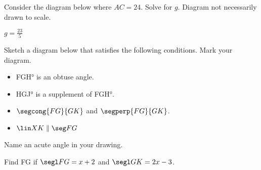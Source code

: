 \begin{exercises}

\begin{ex} \e Consider the diagram below where $AC = 24$.  Solve for $g$.  Diagram not necessarily drawn to scale.

\begin{center}
\end{center}

	\begin{sol}
	$g=\frac{23}{5}$
	\end{sol}
	\end{ex}
	
	\vfill

	\begin{ex}
	\hspace*{\fill}
	\begin{exparts}
	\item \e Sketch a diagram below that satisfies the following conditions. 
	Mark your diagram.

	\begin{itemize}

		\item \ang{FGH} is an obtuse angle.

		\item \ang{HGJ} is a supplement of \ang{FGH}.
		
		\item $\segcong{FG}{GK}$ and $\segperp {FG}{GK}$.

		\item $\lin XK \parallel \seg FG$
		
	\end{itemize}


		\item \e Name an acute angle in your drawing. 
				
		\item Find \segl FG if $\segl FG=x+2$ and $\segl GK=2x-3$. 
		

\end{exparts}
\end{ex}
\end{exercises}
